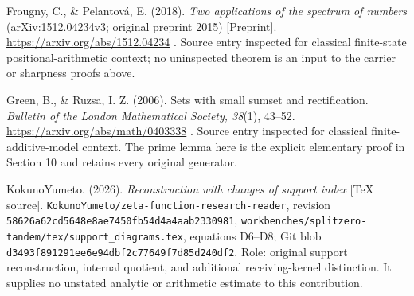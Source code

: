 Frougny, C., \& Pelantová, E. (2018). \emph{Two applications of the spectrum of numbers} (arXiv:1512.04234v3; original preprint 2015) {[}Preprint{]}. \url{https://arxiv.org/abs/1512.04234} . Source entry inspected for classical finite-state positional-arithmetic context; no uninspected theorem is an input to the carrier or sharpness proofs above.

Green, B., \& Ruzsa, I. Z. (2006). Sets with small sumset and rectification. \emph{Bulletin of the London Mathematical Society, 38}(1), 43--52. \url{https://arxiv.org/abs/math/0403338} . Source entry inspected for classical finite-additive-model context. The prime lemma here is the explicit elementary proof in Section 10 and retains every original generator.

KokunoYumeto. (2026). \emph{Reconstruction with changes of support index} {[}TeX source{]}. \nolinkurl{KokunoYumeto/zeta-function-research-reader}, revision \nolinkurl{58626a62cd5648e8ae7450fb54d4a4aab2330981}, \nolinkurl{workbenches/splitzero-tandem/tex/support_diagrams.tex}, equations D6--D8; Git blob \nolinkurl{d3493f891291ee6e94dbf2c77649f7d85d240df2}. Role: original support reconstruction, internal quotient, and additional receiving-kernel distinction. It supplies no unstated analytic or arithmetic estimate to this contribution.
